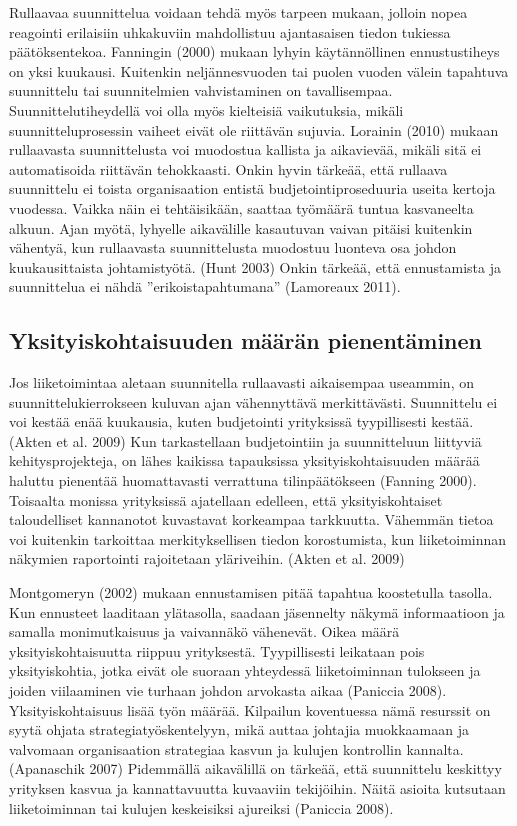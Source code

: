 \documentclass[12pt,a4paper,oneside,pdftex]{report}
\begin{document}
Rullaavaa suunnittelua voidaan tehdä myös tarpeen mukaan, jolloin nopea reagointi erilaisiin uhkakuviin mahdollistuu ajantasaisen tiedon tukiessa päätöksentekoa. Fanningin (2000) mukaan lyhyin käytännöllinen ennustustiheys on yksi kuukausi. Kuitenkin neljännesvuoden tai puolen vuoden välein tapahtuva suunnittelu tai suunnitelmien vahvistaminen on tavallisempaa. Suunnittelutiheydellä voi olla myös kielteisiä vaikutuksia, mikäli suunnitteluprosessin vaiheet eivät ole riittävän sujuvia. Lorainin (2010) mukaan rullaavasta suunnittelusta voi muodostua kallista ja aikavievää, mikäli sitä ei automatisoida riittävän tehokkaasti. Onkin hyvin tärkeää, että rullaava suunnittelu ei toista organisaation entistä budjetointiproseduuria useita kertoja vuodessa. Vaikka näin ei tehtäisikään, saattaa työmäärä tuntua kasvaneelta alkuun. Ajan myötä, lyhyelle aikavälille kasautuvan vaivan pitäisi kuitenkin vähentyä, kun rullaavasta suunnittelusta muodostuu luonteva osa johdon kuukausittaista johtamistyötä. (Hunt 2003) Onkin tärkeää, että ennustamista ja suunnittelua ei nähdä ”erikoistapahtumana” (Lamoreaux 2011).

\subsection{Yksityiskohtaisuuden määrän pienentäminen}

Jos liiketoimintaa aletaan suunnitella rullaavasti aikaisempaa useammin, on suunnittelukierrokseen kuluvan ajan vähennyttävä merkittävästi. Suunnittelu ei voi kestää enää kuukausia, kuten budjetointi yrityksissä tyypillisesti kestää. (Akten et al. 2009) Kun tarkastellaan budjetointiin ja suunnitteluun liittyviä kehitysprojekteja, on lähes kaikissa tapauksissa yksityiskohtaisuuden määrää haluttu pienentää huomattavasti verrattuna tilinpäätökseen (Fanning 2000). Toisaalta monissa yrityksissä ajatellaan edelleen, että yksityiskohtaiset taloudelliset kannanotot kuvastavat korkeampaa tarkkuutta. Vähemmän tietoa voi kuitenkin tarkoittaa merkityksellisen tiedon korostumista, kun liiketoiminnan näkymien raportointi rajoitetaan yläriveihin. (Akten et al. 2009)

Montgomeryn (2002) mukaan ennustamisen pitää tapahtua koostetulla tasolla. Kun ennusteet laaditaan ylätasolla, saadaan jäsennelty näkymä informaatioon ja samalla monimutkaisuus ja vaivannäkö vähenevät. Oikea määrä yksityiskohtaisuutta riippuu yrityksestä. Tyypillisesti leikataan pois yksityiskohtia, jotka eivät ole suoraan yhteydessä liiketoiminnan tulokseen ja joiden viilaaminen vie turhaan johdon arvokasta aikaa (Paniccia 2008). Yksityiskohtaisuus lisää työn määrää. Kilpailun koventuessa nämä resurssit on syytä ohjata strategiatyöskentelyyn, mikä auttaa johtajia muokkaamaan ja valvomaan organisaation strategiaa kasvun ja kulujen kontrollin kannalta. (Apanaschik 2007) Pidemmällä aikavälillä on tärkeää, että suunnittelu keskittyy yrityksen kasvua ja kannattavuutta kuvaaviin tekijöihin. Näitä asioita kutsutaan liiketoiminnan tai kulujen keskeisiksi ajureiksi (Paniccia 2008).
\end{document}
